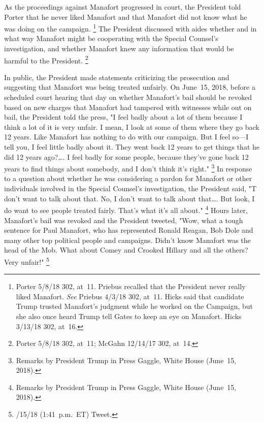 As the proceedings against Manafort progressed in court, the President told Porter that he never liked Manafort and that Manafort did not know what he was doing on the campaign.%
\footnote{Porter 5/8/18 302, at~11.
Priebus recalled that the President never really liked Manafort.
\textit{See} Priebus 4/3/18 302, at~11.
Hicks said that candidate Trump trusted Manafort's judgment while he worked on the Campaign, but she also once heard Trump tell Gates to keep an eye on Manafort.
Hicks 3/13/18 302, at~16.}
The President discussed with aides whether and in what way Manafort might be cooperating with the Special Counsel's investigation, and whether Manafort knew any information that would be harmful to the President.%
\footnote{Porter 5/8/18 302, at~11;
McGahn 12/14/17 302, at~14.}

In public, the President made statements criticizing the prosecution and suggesting that Manafort was being treated unfairly.
On June~15, 2018, before a scheduled court hearing that day on whether Manafort's bail should be revoked based on new charges that Manafort had tampered with witnesses while out on bail, the President told the press, "I feel badly about a lot of them because I think a lot of it is very unfair.
I mean, I look at some of them where they go back 12 years.
Like Manafort has nothing to do with our campaign.
But I feel so---I tell you, I feel little badly about it.
They went back 12 years to get things that he did 12 years ago?\dots.
I feel badly for some people, because they've gone back 12 years to find things about somebody, and I don't think it's right."%
\footnote{Remarks by President Trump in Press Gaggle, White House (June~15, 2018).}
In response to a question about whether he was considering a pardon for Manafort or other individuals involved in the Special Counsel's investigation, the President said, "T don't want to talk about that.
No, I don't want to talk about that\dots.
But look, I do want to see people treated fairly.
That's what it's all about."%
\footnote{Remarks by President Trump in Press Gaggle, White House (June~15, 2018).}
Hours later, Manafort's bail was revoked and the President tweeted, "Wow, what a tough sentence for Paul Manafort, who has represented Ronald Reagan, Bob Dole and many other top political people and campaigns.
Didn't know Manafort was the head of the Mob.
What about Comey and Crooked Hillary and all the others?
Very unfair!"%
\footnote{/15/18 (1:41~p.m.~ET) Tweet.}

